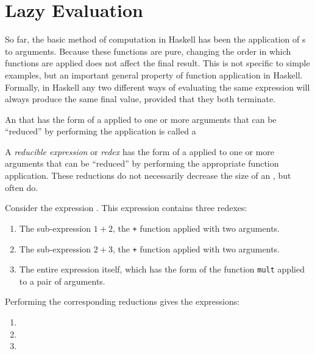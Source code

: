 \section{Lazy Evaluation}\label{sec:Lazy_Evaluation}
So far, the basic method of computation in Haskell has been the application of s to arguments.
Because these functions are pure, changing the order in which functions are applied does not affect the final result.
This is not specific to simple examples, but an important general property of function application in Haskell.
Formally, in Haskell any two different ways of evaluating the same expression will always produce the same final value, provided that they both terminate.

An  that has the form of a  applied to one or more arguments that can be ``reduced'' by performing the application is called a 

\begin{definition}\label{def:Reducible_Expression}
  A \emph{reducible expression} or \emph{redex} has the form of a  applied to one or more arguments that can be ``reduced'' by performing the appropriate function application.
  These reductions do not necessarily decrease the size of an , but often do.
\end{definition}

Consider the expression .
This expression contains three redexes:
\begin{enumerate}[noitemsep]
\item The sub-expression $1+2$, the \texttt{+} function applied with two arguments.
\item The sub-expression $2+3$, the \texttt{+} function applied with two arguments.
\item The entire expression itself, which has the form of the function \texttt{mult} applied to a pair of arguments.
\end{enumerate}

Performing the corresponding reductions gives the expressions:
\begin{enumerate}[noitemsep]
\item {}
\item {}
\item {}
\end{enumerate}

